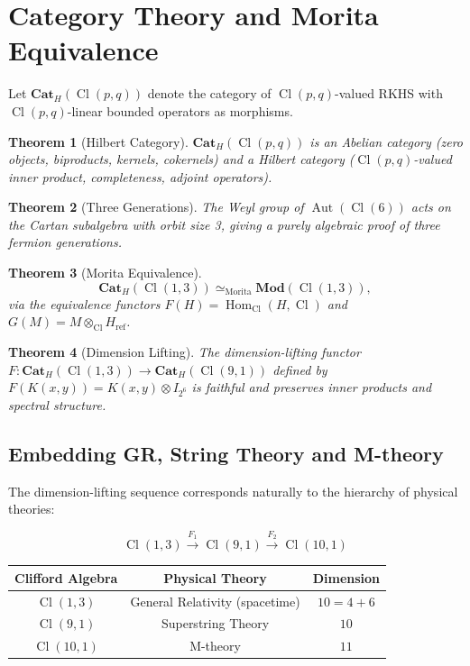 \documentclass[12pt,a4paper]{article}
\newtheorem{theorem}{Theorem}[section]
\newcommand{\Cl}{\operatorname{Cl}}
\newcommand{\Cat}{\mathbf{Cat}}
\newcommand{\Mod}{\mathbf{Mod}}
\newcommand{\Aut}{\operatorname{Aut}}
\newcommand{\Hom}{\operatorname{Hom}}
\begin{document}
\section{Category Theory and Morita Equivalence}
\label{sec:category}

Let $\Cat_H(\Cl(p,q))$ denote the category of $\Cl(p,q)$-valued RKHS with 
$\Cl(p,q)$-linear bounded operators as morphisms.

\begin{theorem}[Hilbert Category]
$\Cat_H(\Cl(p,q))$ is an Abelian category (zero objects, biproducts, kernels, 
cokernels) and a Hilbert category ($\Cl(p,q)$-valued inner product, completeness, 
adjoint operators).
\end{theorem}

\begin{theorem}[Three Generations]
The Weyl group of $\Aut(\Cl(6))$ acts on the Cartan subalgebra with orbit 
size 3, giving a purely algebraic proof of three fermion generations.
\end{theorem}

\begin{theorem}[Morita Equivalence]
\begin{equation}
\Cat_H(\Cl(1,3)) \simeq_{\text{Morita}} \Mod(\Cl(1,3)),
\end{equation}
via the equivalence functors $F(H) = \Hom_{\Cl}(H, \Cl)$ and 
$G(M) = M \otimes_{\Cl} H_{\text{ref}}$.
\end{theorem}

\begin{theorem}[Dimension Lifting]
The dimension-lifting functor $F: \Cat_H(\Cl(1,3)) \to \Cat_H(\Cl(9,1))$ 
defined by $F(K(x,y)) = K(x,y) \otimes I_{2^6}$ is faithful and preserves 
inner products and spectral structure.
\end{theorem}

\subsection{Embedding GR, String Theory and M-theory}

The dimension-lifting sequence corresponds naturally to the hierarchy of physical theories:

\[
\Cl(1,3) \xrightarrow{F_1} \Cl(9,1) \xrightarrow{F_2} \Cl(10,1)
\]

\begin{center}
\begin{tabular}{c|c|c}
\hline
Clifford Algebra & Physical Theory & Dimension \\
\hline
$\Cl(1,3)$ & General Relativity (spacetime) & $10 = 4+6$ \\
$\Cl(9,1)$ & Superstring Theory & $10$ \\
$\Cl(10,1)$ & M-theory & $11$ \\
\hline
\end{tabular}
\end{center}
\end{document}
